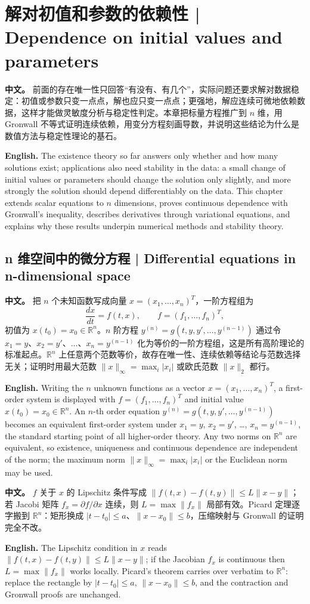 \documentclass[UTF8,11pt,a4paper]{ctexart}
\newcommand{\APS}[2]{\par\noindent\textbf{中文。} #1\par\noindent\textbf{English.} #2\par}
\begin{document}
\section[解对初值和参数的依赖]{解对初值和参数的依赖性 | Dependence on initial values and parameters}
\APS{前面的存在唯一性只回答“有没有、有几个”，实际问题还要求解对数据稳定：初值或参数只变一点点，解也应只变一点点；更强地，解应连续可微地依赖数据，这样才能做灵敏度分析与稳定性判定。本章把标量方程推广到 $n$ 维，用 Gronwall 不等式证明连续依赖，用变分方程刻画导数，并说明这些结论为什么是数值方法与稳定性理论的基石。}{The existence theory so far answers only whether and how many solutions exist; applications also need stability in the data: a small change of initial values or parameters should change the solution only slightly, and more strongly the solution should depend differentiably on the data. This chapter extends scalar equations to $n$ dimensions, proves continuous dependence with Gronwall's inequality, describes derivatives through variational equations, and explains why these results underpin numerical methods and stability theory.}
\subsection{n 维空间中的微分方程 | Differential equations in n-dimensional space}
\APS{把 $n$ 个未知函数写成向量 $x=(x_1,\dots,x_n)^T$，一阶方程组为
\[
\frac{dx}{dt}=f(t,x),\qquad f=(f_1,\dots,f_n)^T,
\]
初值为 $x(t_0)=x_0\in\mathbb R^n$。$n$ 阶方程 $y^{(n)}=g(t,y,y',\dots,y^{(n-1)})$ 通过令 $x_1=y$、$x_2=y'$、$\dots$、$x_n=y^{(n-1)}$ 化为等价的一阶方程组，这是所有高阶理论的标准起点。$\mathbb R^n$ 上任意两个范数等价，故存在唯一性、连续依赖等结论与范数选择无关；证明时用最大范数 $\|x\|_\infty=\max_i|x_i|$ 或欧氏范数 $\|x\|_2$ 都行。}{Writing the $n$ unknown functions as a vector $x=(x_1,\dots,x_n)^T$, a first-order system is displayed with $f=(f_1,\dots,f_n)^T$ and initial value $x(t_0)=x_0\in\mathbb R^n$. An $n$-th order equation $y^{(n)}=g(t,y,y',\dots,y^{(n-1)})$ becomes an equivalent first-order system under $x_1=y$, $x_2=y'$, \dots, $x_n=y^{(n-1)}$, the standard starting point of all higher-order theory. Any two norms on $\mathbb R^n$ are equivalent, so existence, uniqueness and continuous dependence are independent of the norm; the maximum norm $\|x\|_\infty=\max_i|x_i|$ or the Euclidean norm may be used.}
\APS{$f$ 关于 $x$ 的 Lipschitz 条件写成 $\|f(t,x)-f(t,y)\|\le L\|x-y\|$；若 Jacobi 矩阵 $f_x=\partial f/\partial x$ 连续，则 $L=\max\|f_x\|$ 局部有效。Picard 定理逐字搬到 $\mathbb R^n$：矩形换成 $|t-t_0|\le a$、$\|x-x_0\|\le b$，压缩映射与 Gronwall 的证明完全不改。}{The Lipschitz condition in $x$ reads $\|f(t,x)-f(t,y)\|\le L\|x-y\|$; if the Jacobian $f_x$ is continuous then $L=\max\|f_x\|$ works locally. Picard's theorem carries over verbatim to $\mathbb R^n$: replace the rectangle by $|t-t_0|\le a$, $\|x-x_0\|\le b$, and the contraction and Gronwall proofs are unchanged.}
\end{document}

